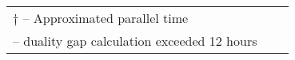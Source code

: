 \documentclass[11.5pt]{article}
\begin{document}
\begin{table}[H]
\begin{tabular}{l|l|rrr|rrrr|r}
\bottomrule
\multicolumn{8}{l}{\scriptsize $\dagger$ -- Approximated parallel time}\\
\multicolumn{8}{l}{\scriptsize* -- duality gap calculation exceeded 12 hours}  
\end{tabular}
\end{table}
\end{document}
